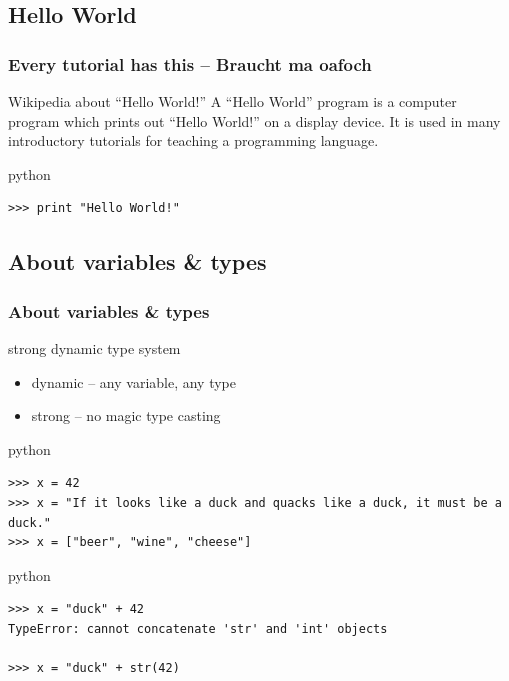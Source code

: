 \documentclass{beamer}
\begin{document}
\subsection{Hello World}
\begin{frame}[fragile]
    \frametitle{Every tutorial has this -- Braucht ma oafoch}
    \begin{block}{Wikipedia about ``Hello World!''}
    A ``Hello World'' program is a computer program which prints out ``Hello World!'' on a display device. It is used in many introductory tutorials for teaching a programming language.
    \end{block}
\pause
    \begin{exampleblock}{python}
    \begin{lstlisting}
>>> print "Hello World!" 
    \end{lstlisting}
    \end{exampleblock}
\end{frame}

\subsection{About variables \& types}
\begin{frame}[fragile]
	\frametitle{About variables \& types}
	\begin{block}{strong dynamic type system}
	\begin{itemize}
	\item dynamic -- any variable, any type
	\item strong -- no magic type casting
	\end{itemize}
	\end{block}
\pause
	\begin{exampleblock}{python}
	\begin{lstlisting}
>>> x = 42
>>> x = "If it looks like a duck and quacks like a duck, it must be a duck."
>>> x = ["beer", "wine", "cheese"]
	\end{lstlisting}
	\end{exampleblock}

\pause

	\begin{exampleblock}{python}
	\begin{lstlisting}
>>> x = "duck" + 42
TypeError: cannot concatenate 'str' and 'int' objects

>>> x = "duck" + str(42)
	\end{lstlisting}
	\end{exampleblock}
\end{frame}
\end{document}

